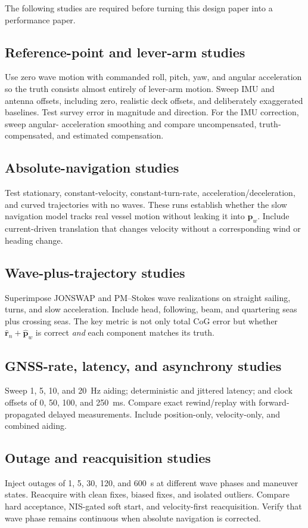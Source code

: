 \documentclass[conference]{IEEEtran}
\DeclareRobustCommand{\vct}[1]{\bm{#1}}
\begin{document}
The following studies are required before turning this design paper into a performance
paper.

\subsection{Reference-point and lever-arm studies}
Use zero wave motion with commanded roll, pitch, yaw, and angular acceleration so the
truth consists almost entirely of lever-arm motion.  Sweep IMU and antenna offsets,
including zero, realistic deck offsets, and deliberately exaggerated baselines.  Test
survey error in magnitude and direction.  For the IMU correction, sweep angular-
acceleration smoothing and compare uncompensated, truth-compensated, and estimated
compensation.

\subsection{Absolute-navigation studies}
Test stationary, constant-velocity, constant-turn-rate, acceleration/deceleration,
and curved trajectories with no waves.  These runs establish whether the slow
navigation model tracks real vessel motion without leaking it into $\vct p_w$.
Include current-driven translation that changes velocity without a corresponding wind
or heading change.

\subsection{Wave-plus-trajectory studies}
Superimpose JONSWAP and PM--Stokes wave realizations on straight sailing, turns, and
slow acceleration.  Include head, following, beam, and quartering seas plus crossing
seas.  The key metric is not only total CoG error but whether
$\hat{\vct r}_n+\hat{\vct p}_w$ is correct \emph{and} each component matches its truth.

\subsection{GNSS-rate, latency, and asynchrony studies}
Sweep 1, 5, 10, and 20~Hz aiding; deterministic and jittered latency; and clock offsets
of 0, 50, 100, and 250~ms.  Compare exact rewind/replay with forward-propagated delayed
measurements.  Include position-only, velocity-only, and combined aiding.

\subsection{Outage and reacquisition studies}
Inject outages of 1, 5, 30, 120, and 600~s at different wave phases and maneuver
states.  Reacquire with clean fixes, biased fixes, and isolated outliers.  Compare hard
acceptance, NIS-gated soft start, and velocity-first reacquisition.  Verify that wave
phase remains continuous when absolute navigation is corrected.
\end{document}
